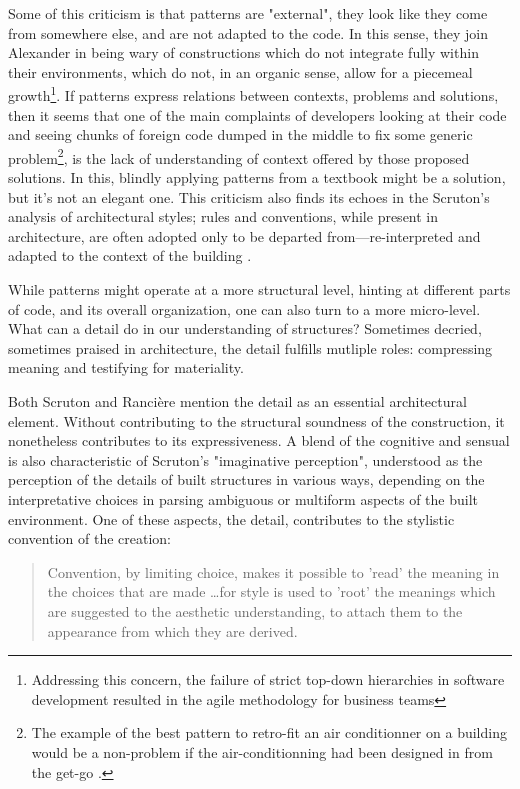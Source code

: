 Some of this criticism is that patterns are "external", they look like they come from somewhere else, and are not adapted to the code. In this sense, they join Alexander in being wary of constructions which do not integrate fully within their environments, which do not, in an organic sense, allow for a piecemeal growth\footnote{Addressing this concern, the failure of strict top-down hierarchies in software development resulted in the agile methodology for business teams}. If patterns express relations between contexts, problems and solutions, then it seems that one of the main complaints of developers looking at their code and seeing chunks of foreign code dumped in the middle to fix some generic problem\footnote{The example of the best pattern to retro-fit an air conditionner on a building would be a non-problem if the air-conditionning had been designed in from the get-go \citep{coplien_patterns_2009}.}, is the lack of understanding of context offered by those proposed solutions. In this, blindly applying patterns from a textbook might be a solution, but it's not an elegant one. This criticism also finds its echoes in the Scruton's analysis of architectural styles; rules and conventions, while present in architecture, are often adopted only to be departed from—re-interpreted and adapted to the context of the building \citep{scruton_aesthetics_2013}.

While patterns might operate at a more structural level, hinting at different parts of code, and its overall organization, one can also turn to a more micro-level. What can a detail do in our understanding of structures? Sometimes decried, sometimes praised in architecture, the detail fulfills mutliple roles: compressing meaning and testifying for materiality.

Both Scruton and Rancière mention the detail as an essential architectural element. Without contributing to the structural soundness of the construction, it nonetheless contributes to its expressiveness. A blend of the cognitive and sensual is also characteristic of Scruton's "imaginative perception", understood as the perception of the details of built structures in various ways, depending on the interpretative choices in parsing ambiguous or multiform aspects of the built environment. One of these aspects, the detail, contributes to the stylistic convention of the creation:

\begin{quote}
    Convention, by limiting choice, makes it possible to 'read' the meaning in the choices that are made \dots for style is used to 'root' the meanings which are suggested to the aesthetic understanding, to attach them to the appearance from which they are derived. \citep{scruton_aesthetics_2013}
\end{quote}

